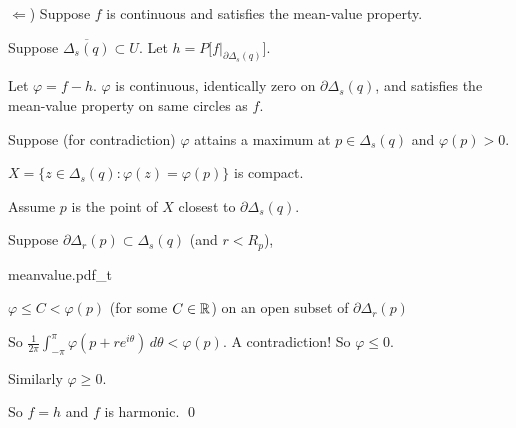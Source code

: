 \documentclass[10pt,aspectratio=169]{beamer}
\begin{document}
\begin{frame}
$\Leftarrow$) \pause
Suppose $f$ is continuous and satisfies the
mean-value property.

\medskip
\pause

Suppose $\overline{\Delta_s(q)} \subset U$.
\qquad
\pause
Let $h = P\bigl[f|_{\partial \Delta_s(q)}\big]$.

\medskip
\pause
Let $\varphi = f-h$.
\quad
\pause
$\varphi$ is continuous,
\pause
identically zero on $\partial \Delta_s(q)$,
\pause
and satisfies the mean-value property on same circles as $f$.

\medskip
\pause
Suppose (for contradiction) $\varphi$
attains a maximum at $p \in \Delta_s(q)$ and
$\varphi(p) > 0$.

\medskip
\pause
$X = \bigl\{ z \in \Delta_s(q) : \varphi(z) = \varphi(p) \bigr\}$ is compact.

\medskip
\pause
Assume $p$ is the point of $X$ closest to $\partial \Delta_s(q)$.

\medskip
\pause
Suppose $\partial \Delta_r(p) \subset \Delta_s(q)$ (and $r < R_p$),

\vspace*{-0.8in}
\hfill
{meanvalue.pdf_t}

\vspace*{-0.5in}

\pause
$\varphi \leq C < \varphi(p)$ (for some $C \in {\mathbb{R}}$) on an open subset of $\partial \Delta_r(p)$

\medskip
\pause
So
\quad
$\displaystyle
\frac{1}{2\pi} \int_{-\pi}^{\pi} \varphi(p+re^{i\theta})\, d\theta <
\varphi(p)$.
\pause
\quad
A contradiction!
\pause
\quad
So $\varphi \leq 0$.

\medskip
\pause

Similarly $\varphi \geq 0$.

\medskip
\pause

So $f=h$ and $f$ is harmonic. \qed
\end{frame}
\end{document}
